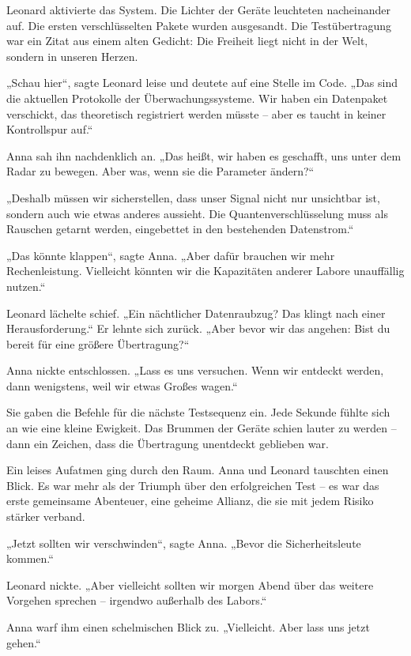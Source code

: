 \documentclass[
]{article}
\begin{document}
Leonard aktivierte das System. Die Lichter der Geräte leuchteten nacheinander auf. Die ersten verschlüsselten Pakete wurden ausgesandt. Die Testübertragung war ein Zitat aus einem alten Gedicht: Die Freiheit liegt nicht in der Welt, sondern in unseren Herzen.

„Schau hier``, sagte Leonard leise und deutete auf eine Stelle im Code. „Das sind die aktuellen Protokolle der Überwachungssysteme. Wir haben ein Datenpaket verschickt, das theoretisch registriert werden müsste -- aber es taucht in keiner Kontrollspur auf.``

Anna sah ihn nachdenklich an. „Das heißt, wir haben es geschafft, uns unter dem Radar zu bewegen. Aber was, wenn sie die Parameter ändern?{\kern0pt}``

„Deshalb müssen wir sicherstellen, dass unser Signal nicht nur unsichtbar ist, sondern auch wie etwas anderes aussieht. Die Quantenverschlüsselung muss als Rauschen getarnt werden, eingebettet in den bestehenden Datenstrom.``

„Das könnte klappen``, sagte Anna. „Aber dafür brauchen wir mehr Rechenleistung. Vielleicht könnten wir die Kapazitäten anderer Labore unauffällig nutzen.``

Leonard lächelte schief. „Ein nächtlicher Datenraubzug? Das klingt nach einer Herausforderung.`` Er lehnte sich zurück. „Aber bevor wir das angehen: Bist du bereit für eine größere Übertragung?{\kern0pt}``

Anna nickte entschlossen. „Lass es uns versuchen. Wenn wir entdeckt werden, dann wenigstens, weil wir etwas Großes wagen.``

Sie gaben die Befehle für die nächste Testsequenz ein. Jede Sekunde fühlte sich an wie eine kleine Ewigkeit. Das Brummen der Geräte schien lauter zu werden -- dann ein Zeichen, dass die Übertragung unentdeckt geblieben war.

Ein leises Aufatmen ging durch den Raum. Anna und Leonard tauschten einen Blick. Es war mehr als der Triumph über den erfolgreichen Test -- es war das erste gemeinsame Abenteuer, eine geheime Allianz, die sie mit jedem Risiko stärker verband.

„Jetzt sollten wir verschwinden``, sagte Anna. „Bevor die Sicherheitsleute kommen.``

Leonard nickte. „Aber vielleicht sollten wir morgen Abend über das weitere Vorgehen sprechen -- irgendwo außerhalb des Labors.``

Anna warf ihm einen schelmischen Blick zu. „Vielleicht. Aber lass uns jetzt gehen.``
\end{document}
